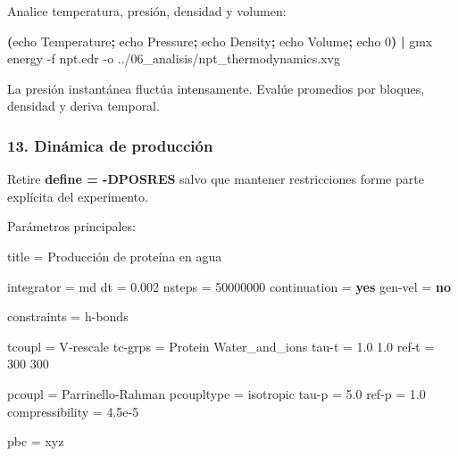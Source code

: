 \documentclass[
  spanish,
  11pt,
  a4paper]{article}
\newenvironment{Shaded}{\begin{snugshade}}{\end{snugshade}}
\newcommand{\AttributeTok}[1]{\textcolor[rgb]{0.13,0.29,0.53}{#1}}
\newcommand{\BuiltInTok}[1]{#1}
\newcommand{\DataTypeTok}[1]{\textcolor[rgb]{0.13,0.29,0.53}{#1}}
\newcommand{\DecValTok}[1]{\textcolor[rgb]{0.00,0.00,0.81}{#1}}
\newcommand{\ExtensionTok}[1]{#1}
\newcommand{\FloatTok}[1]{\textcolor[rgb]{0.00,0.00,0.81}{#1}}
\newcommand{\KeywordTok}[1]{\textcolor[rgb]{0.13,0.29,0.53}{\textbf{#1}}}
\newcommand{\NormalTok}[1]{#1}
\newcommand{\OtherTok}[1]{\textcolor[rgb]{0.56,0.35,0.01}{#1}}
\newcommand{\StringTok}[1]{\textcolor[rgb]{0.31,0.60,0.02}{#1}}
\begin{document}
Analice temperatura, presión, densidad y volumen:

\begin{Shaded}
\begin{Highlighting}[]
\KeywordTok{(}\BuiltInTok{echo}\NormalTok{ Temperature}\KeywordTok{;} \BuiltInTok{echo}\NormalTok{ Pressure}\KeywordTok{;} \BuiltInTok{echo}\NormalTok{ Density}\KeywordTok{;} \BuiltInTok{echo}\NormalTok{ Volume}\KeywordTok{;} \BuiltInTok{echo}\NormalTok{ 0}\KeywordTok{)} \KeywordTok{|}
\ExtensionTok{gmx}\NormalTok{ energy     }\AttributeTok{{-}f}\NormalTok{ npt.edr     }\AttributeTok{{-}o}\NormalTok{ ../06\_analisis/npt\_thermodynamics.xvg}
\end{Highlighting}
\end{Shaded}

La presión instantánea fluctúa intensamente. Evalúe promedios por
bloques, densidad y deriva temporal.

\subsubsection{13. Dinámica de
producción}\label{dinuxe1mica-de-producciuxf3n}

Retire \textbf{define = -DPOSRES} salvo que mantener restricciones forme
parte explícita del experimento.

Parámetros principales:

\begin{Shaded}
\begin{Highlighting}[]
\DataTypeTok{title            }\OtherTok{=}\StringTok{ Producción de proteína en agua}

\DataTypeTok{integrator       }\OtherTok{=}\StringTok{ md}
\DataTypeTok{dt               }\OtherTok{=}\StringTok{ }\FloatTok{0.002}
\DataTypeTok{nsteps           }\OtherTok{=}\StringTok{ }\DecValTok{50000000}
\DataTypeTok{continuation     }\OtherTok{=}\StringTok{ }\KeywordTok{yes}
\DataTypeTok{gen{-}vel          }\OtherTok{=}\StringTok{ }\KeywordTok{no}

\DataTypeTok{constraints      }\OtherTok{=}\StringTok{ h{-}bonds}

\DataTypeTok{tcoupl           }\OtherTok{=}\StringTok{ V{-}rescale}
\DataTypeTok{tc{-}grps          }\OtherTok{=}\StringTok{ Protein Water\_and\_ions}
\DataTypeTok{tau{-}t            }\OtherTok{=}\StringTok{ 1.0 1.0}
\DataTypeTok{ref{-}t            }\OtherTok{=}\StringTok{ 300 300}

\DataTypeTok{pcoupl           }\OtherTok{=}\StringTok{ Parrinello{-}Rahman}
\DataTypeTok{pcoupltype       }\OtherTok{=}\StringTok{ isotropic}
\DataTypeTok{tau{-}p            }\OtherTok{=}\StringTok{ }\FloatTok{5.0}
\DataTypeTok{ref{-}p            }\OtherTok{=}\StringTok{ }\FloatTok{1.0}
\DataTypeTok{compressibility  }\OtherTok{=}\StringTok{ 4.5e{-}5}

\DataTypeTok{pbc              }\OtherTok{=}\StringTok{ xyz}
\end{Highlighting}
\end{Shaded}
\end{document}
